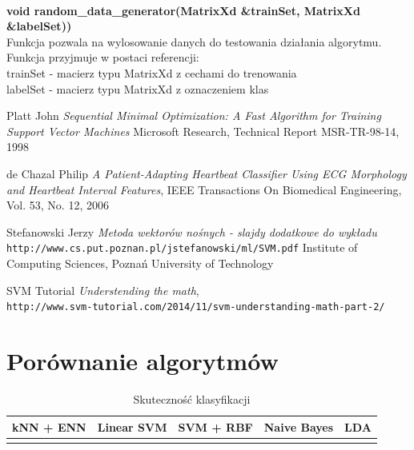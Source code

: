 \documentclass[[10pt,a4paper]{article}
\begin{document}
\newline
\newline
\newline
{}\\
\newline
\textbf {void random\_data\_generator(MatrixXd \&trainSet, MatrixXd \&labelSet))}\\
\newline
\vspace{3mm}Funkcja pozwala na wylosowanie danych do testowania działania algorytmu.\\
\vspace{3mm}Funkcja przyjmuje w postaci referencji:\\
trainSet - macierz typu MatrixXd z cechami do trenowania\\
labelSet - macierz typu MatrixXd z oznaczeniem klas\\
\begin{thebibliography}{9}

Platt John
\textit{Sequential Minimal Optimization: A Fast Algorithm for Training Support Vector Machines} 
Microsoft Research, Technical Report MSR-TR-98-14, 1998

de Chazal Philip 
\textit{A Patient-Adapting Heartbeat Classifier Using ECG Morphology and Heartbeat Interval Features},
IEEE Transactions On Biomedical Engineering, Vol. 53, No. 12, 2006

Stefanowski Jerzy
\textit{Metoda wektorów nośnych - slajdy dodatkowe do wykładu} 
\\\texttt{http://www.cs.put.poznan.pl/jstefanowski/ml/SVM.pdf}
Institute of Computing Sciences, Poznań University of Technology


SVM Tutorial
\textit{Understending the math}, 
\\\texttt{http://www.svm-tutorial.com/2014/11/svm-understanding-math-part-2/}

\end{thebibliography}

\section{Porównanie algorytmów}



\begin{table}[h]
\centering
\caption{Skuteczność klasyfikacji}
\label{accuracyTable}
\begin{tabular}{|l|l|l|l|l|}
\hline
kNN + ENN & Linear SVM & SVM + RBF & Naive Bayes & LDA \\ \hline
          &            &           &             &     \\ \hline
\end{tabular}
\end{table}
\end{document}

